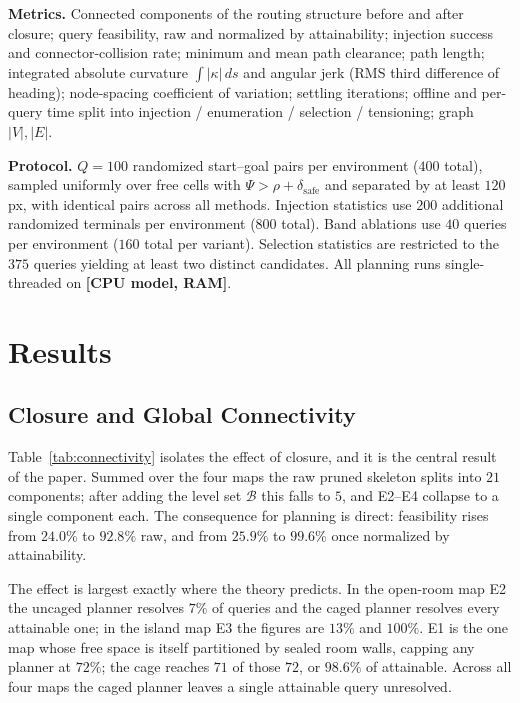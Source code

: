 \documentclass[conference]{IEEEtran}
\newcommand{\PH}[1]{{\color{red}\textbf{[#1]}}}
\begin{document}
\textbf{Metrics.} Connected components of the routing structure before and after closure; query feasibility, raw and normalized by attainability; injection success and connector-collision rate; minimum and mean path clearance; path length; integrated absolute curvature $\int|\kappa|\,ds$ and angular jerk (RMS third difference of heading); node-spacing coefficient of variation; settling iterations; offline and per-query time split into injection / enumeration / selection / tensioning; graph $|V|,|E|$.

\textbf{Protocol.} $Q=100$ randomized start--goal pairs per environment ($400$ total), sampled uniformly over free cells with $\Psi>\rho+\delta_{\mathrm{safe}}$ and separated by at least $120$ px, with identical pairs across all methods. Injection statistics use $200$ additional randomized terminals per environment ($800$ total). Band ablations use $40$ queries per environment ($160$ total per variant). Selection statistics are restricted to the $375$ queries yielding at least two distinct candidates. All planning runs single-threaded on \PH{CPU model, RAM}.

\section{Results}
\label{sec:results}

\subsection{Closure and Global Connectivity}
\label{sec:res-connectivity}

Table~\ref{tab:connectivity} isolates the effect of closure, and it is the central result of the paper. Summed over the four maps the raw pruned skeleton splits into $21$ components; after adding the level set $\mathcal{B}$ this falls to $5$, and E2--E4 collapse to a single component each. The consequence for planning is direct: feasibility rises from $24.0\%$ to $92.8\%$ raw, and from $25.9\%$ to $99.6\%$ once normalized by attainability.

The effect is largest exactly where the theory predicts. In the open-room map E2 the uncaged planner resolves $7\%$ of queries and the caged planner resolves every attainable one; in the island map E3 the figures are $13\%$ and $100\%$. E1 is the one map whose free space is itself partitioned by sealed room walls, capping any planner at $72\%$; the cage reaches $71$ of those $72$, or $98.6\%$ of attainable. Across all four maps the caged planner leaves a single attainable query unresolved.
\end{document}
